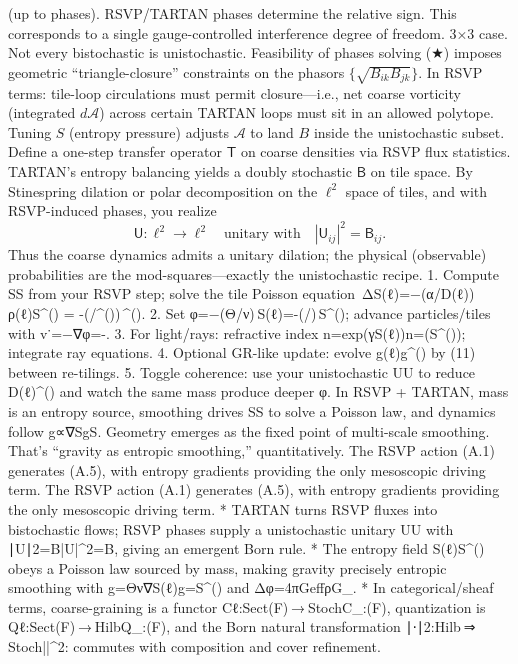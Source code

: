 \documentclass[11pt]{article}
\theoremstyle{plain}
\theoremstyle{definition}
\begin{document}
(up to phases). RSVP/TARTAN phases determine the relative sign. This corresponds to a single gauge-controlled interference degree of freedom.
3×3 case. Not every bistochastic is unistochastic. Feasibility of phases solving (★) imposes geometric “triangle-closure” constraints on the phasors $\{\sqrt{B_{ik} B_{jk}}\}$. In RSVP terms: tile-loop circulations must permit closure—i.e., net coarse vorticity (integrated $d\mathcal{A}$) across certain TARTAN loops must sit in an allowed polytope. Tuning $S$ (entropy pressure) adjusts $\mathcal{A}$ to land $B$ inside the unistochastic subset.
Define a one-step transfer operator $\mathsf{T}$ on coarse densities via RSVP flux statistics. TARTAN’s entropy balancing yields a doubly stochastic $\mathsf{B}$ on tile space. By Stinespring dilation or polar decomposition on the $\ell^2$ space of tiles, and with RSVP-induced phases, you realize
\[
\mathsf{U}: \ell^2 \to \ell^2 \quad \text{unitary with} \quad |\mathsf{U}_{ij}|^2 = \mathsf{B}_{ij}.
\]
Thus the coarse dynamics admits a unitary dilation; the physical (observable) probabilities are the mod-squares—exactly the unistochastic recipe.
1. Compute SS from your RSVP step; solve the tile Poisson equation\
   ΔS(ℓ)=−(α/D(ℓ)) ρ(ℓ)\Delta S^{(\ell)} = -(\alpha/^{(\ell)})\,\rho^{(\ell)}.
2. Set φ=−(Θ/ν) S(ℓ)\varphi=-(\Theta/\nu)\,S^{(\ell)}; advance particles/tiles with v˙=−∇φ=-\nabla\varphi.
3. For light/rays: refractive index n=exp⁡(γS(ℓ))n=\exp(\gamma S^{(\ell)}); integrate ray equations.
4. Optional GR-like update: evolve g(ℓ)g^{(\ell)} by (11) between re-tilings.
5. Toggle coherence: use your unistochastic UU to reduce D(ℓ)\mathcal{D}^{(\ell)} and watch the same mass produce deeper φ\varphi.
In RSVP + TARTAN, mass is an entropy source, smoothing drives SS to solve a Poisson law, and dynamics follow g∝∇S\mathbf g\propto\nabla S. Geometry emerges as the fixed point of multi-scale smoothing. That’s “gravity as entropic smoothing,” quantitatively.
The RSVP action (A.1) generates (A.5), with entropy gradients providing the only mesoscopic driving term.
The RSVP action (A.1) generates (A.5), with entropy gradients providing the only mesoscopic driving term.
* TARTAN turns RSVP fluxes into bistochastic flows; RSVP phases supply a unistochastic unitary UU with ∣U∣2=B|U|^2=B, giving an emergent Born rule.
* The entropy field S(ℓ)S^{(\ell)} obeys a Poisson law sourced by mass, making gravity precisely entropic smoothing with g=Θν∇S(ℓ)\mathbf g=\frac{\Theta}{\nu}\nabla S^{(\ell)} and Δφ=4πGeffρ\Delta{}\pi G_\rho.
* In categorical/sheaf terms, coarse-graining is a functor Cℓ:Sect(F) ⁣→ ⁣Stoch\mathsf C_\ell:\mathrm{Sect}(\mathcal F)\!\to\!\mathbf{Stoch}, quantization is Qℓ:Sect(F) ⁣→ ⁣Hilb\mathsf Q_\ell:\mathrm{Sect}(\mathcal F)\!\to\!, and the Born natural transformation ∣⋅∣2:Hilb ⁣⇒ ⁣Stoch|\cdot|^2:\!\Rightarrow\! commutes with composition and cover refinement.
\end{document}
